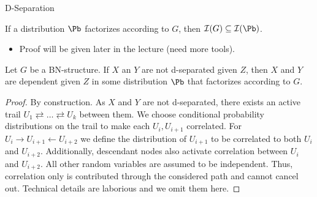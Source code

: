 \begin{frame}{D-Separation}
    \label{slide:d-separation}
\begin{theorem}
    If a distribution $\Pb$ factorizes according to $G$, then $\mathcal{I}(G) \subseteq \mathcal{I}(\Pb)$.
\end{theorem}
\pause
\begin{itemize}
    \item Proof will be given later in the lecture (need more tools).
\end{itemize}
\pause
\begin{theorem}[Completeness]
Let $G$ be a BN-structure. If $X$ an $Y$ are not d-separated given $Z$, then $X$ and $Y$ are dependent given $Z$ in some distribution  $\Pb$ that factorizes according to $G$.
\end{theorem}
\pause
\begin{proof}
    By construction.
    As $X$ and $Y$ are not d-separated, there exists an active trail $U_1 \rightleftarrows \ldots \rightleftarrows U_k$ between them.
    We choose conditional probability distributions on the trail to make each $U_i, U_{i+1}$ correlated.
    \pause
    For $U_{i} \rightarrow U_{i+1} \leftarrow U_{i+2}$ we define the distribution of $U_{i+1}$ to be correlated to both $U_{i}$ and $U_{i+2}$.
    Additionally, descendant nodes also activate correlation between $U_i$ and $U_{i+2}$.
    \pause 
    All other random variables are assumed to be independent.
    \pause 
    Thus, correlation only is contributed through the considered path and cannot cancel out.
    \pause Technical details are laborious and we omit them here.
    
\end{proof}
\end{frame}

